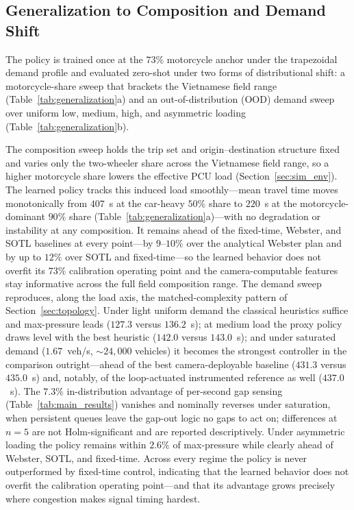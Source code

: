 \subsection{Generalization to Composition and Demand Shift}
\label{sec:generalization}
The policy is trained once at the $73\%$ motorcycle anchor under the trapezoidal demand
profile and evaluated zero-shot under two forms of distributional shift: a motorcycle-share
sweep that brackets the Vietnamese field range (Table~\ref{tab:generalization}a) and an
out-of-distribution (OOD) demand sweep over uniform low, medium, high, and asymmetric loading
(Table~\ref{tab:generalization}b).

The composition sweep holds the trip set and origin--destination structure fixed and varies only
the two-wheeler share across the Vietnamese field range, so a higher motorcycle share lowers the
effective PCU load (Section~\ref{sec:sim_env}). The learned policy tracks this induced load
smoothly---mean travel time moves monotonically from $407$~s at the car-heavy $50\%$ share to
$220$~s at the motorcycle-dominant $90\%$ share (Table~\ref{tab:generalization}a)---with no
degradation or instability at any composition. It remains ahead of the fixed-time, Webster, and
SOTL baselines at every point---by $9$--$10\%$ over the analytical Webster plan and by up to
$12\%$ over SOTL and fixed-time---so the learned behavior does not overfit its $73\%$ calibration
operating point and the camera-computable features stay informative across the full field
composition range.
The demand sweep reproduces, along the load axis, the matched-complexity pattern of
Section~\ref{sec:topology}. Under light uniform demand the classical heuristics suffice and
max-pressure leads ($127.3$ versus $136.2$~s); at medium load the proxy policy draws level
with the best heuristic ($142.0$ versus $143.0$~s); and under saturated demand
($1.67$~veh/s, ${\sim}24{,}000$ vehicles) it becomes the strongest controller in the
comparison outright---ahead of the best camera-deployable baseline ($431.3$ versus
$435.0$~s) and, notably, of the loop-actuated instrumented reference as well ($437.0$~s).
The $7.3\%$ in-distribution advantage of per-second gap sensing
(Table~\ref{tab:main_results}) vanishes and nominally reverses under saturation, when
persistent queues leave the gap-out logic no gaps to act on; differences at $n{=}5$ are not
Holm-significant and are reported descriptively. Under asymmetric loading the policy remains
within $2.6\%$ of max-pressure while clearly ahead of Webster, SOTL, and fixed-time. Across
every regime the policy is never outperformed by fixed-time control, indicating that the
learned behavior does not overfit the calibration operating point---and that its advantage
grows precisely where congestion makes signal timing hardest.

